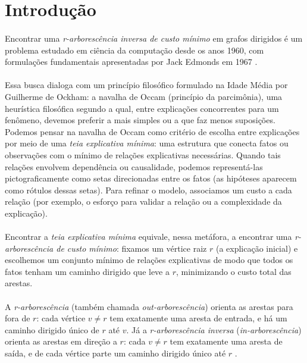 \documentclass[12pt,a4paper]{article}
\begin{document}
\setcounter{tocdepth}{3}
\setcounter{secnumdepth}{3}
\tableofcontents
\clearpage
\listoffigures
\clearpage

\section{Introdução}

\paragraph{}
Encontrar uma \textit{r-arborescência inversa de custo mínimo} em grafos dirigidos é um problema estudado em ciência da computação desde os anos 1960, com formulações fundamentais apresentadas por Jack Edmonds em 1967 \cite{edmonds1967optimum}.

\paragraph{}
Essa busca dialoga com um princípio filosófico formulado na Idade Média por Guilherme de Ockham: a navalha de Occam (princípio da parcimônia), uma heurística filosófica segundo a qual, entre explicações concorrentes para um fenômeno, devemos preferir a mais simples ou a que faz menos suposições.
Podemos pensar na navalha de Occam como critério de escolha entre explicações por meio de uma \textit{teia explicativa mínima}: uma estrutura que conecta fatos ou observações com o mínimo de relações explicativas necessárias.
Quando tais relações envolvem dependência ou causalidade, podemos representá-las pictograficamente como setas direcionadas entre os fatos (as hipóteses aparecem como rótulos dessas setas).
Para refinar o modelo, associamos um custo a cada relação (por exemplo, o esforço para validar a relação ou a complexidade da explicação).

\paragraph{}
Encontrar a \textit{teia explicativa mínima} equivale, nessa metáfora, a encontrar uma \textit{r-arborescência de custo mínimo}: fixamos um vértice raiz \(r\) (a explicação inicial) e escolhemos um conjunto mínimo de relações explicativas de modo que todos os fatos tenham um caminho dirigido que leve a \(r\), minimizando o custo total das arestas.

\paragraph{}
A \textit{r-arborescência} (também chamada \textit{out-arborescência}) orienta as arestas para fora de \(r\): cada vértice \(v\neq r\) tem exatamente uma aresta de entrada, e há um caminho dirigido único de \(r\) até \(v\). Já a \textit{r-arborescência inversa} (\textit{in-arborescência}) orienta as arestas em direção a \(r\): cada \(v\neq r\) tem exatamente uma aresta de saída, e de cada vértice parte um caminho dirigido único até \(r\) \cite{edmonds1967optimum,frank2014}.
\end{document}

